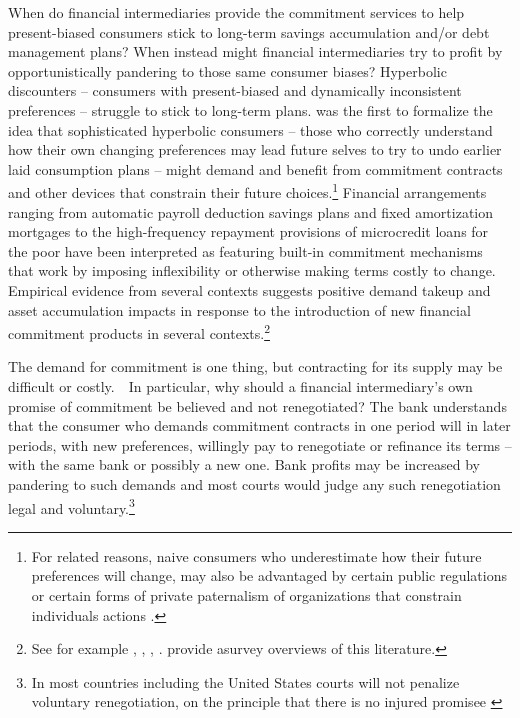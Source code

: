 \documentclass[11pt,english]{article}
\theoremstyle{plain}
\theoremstyle{definition}
\begin{document}
When do financial intermediaries provide the commitment services to help present-biased consumers stick to long-term savings accumulation and/or debt management
plans? When instead might financial intermediaries try to profit by opportunistically pandering to those same consumer biases?
Hyperbolic discounters --{} consumers with present-biased
and dynamically inconsistent preferences -- struggle to stick to long-term plans.  \citet{strotz1956} was the first to formalize the idea that sophisticated hyperbolic consumers -- those who correctly understand how their own  changing preferences may lead future selves to try to  undo earlier laid consumption plans -- might demand and benefit from commitment  contracts and other devices that constrain their future choices.\footnote{For related reasons,  naive consumers who underestimate how their future preferences  will change, may also be advantaged by certain public regulations or certain forms of private paternalism of organizations  that constrain individuals  actions \citep{spiegler2011}.}  Financial arrangements ranging from automatic payroll deduction  savings plans and fixed amortization mortgages to the high-frequency repayment
provisions of microcredit loans for the poor
have been interpreted as featuring built-in commitment mechanisms that work by imposing inflexibility or otherwise making terms costly to change. 
 Empirical evidence from several contexts suggests positive demand takeup and asset accumulation impacts in response to the introduction of new financial commitment
products in several contexts.\footnote{See for example  \citet{ariely_procrastination_2002}, \citet{thaler2004}, \citet{ashraf_tying_2006}, \citet{bauer_behavioral_2012}.  \citet{bryan2010} provide asurvey overviews of this literature.}  



The demand for commitment is one thing, but contracting for its supply may be difficult or costly.\ \ In particular, why should a financial intermediary's own promise of commitment  be believed and not renegotiated? The bank understands that the consumer who demands commitment contracts in one period will in later periods, with new preferences,  willingly  pay to renegotiate or refinance its terms -- with the same bank or possibly a new one. Bank
profits may be increased by pandering to such demands and most courts would judge any such renegotiation legal and voluntary.\footnote{In most countries including the United States courts will not penalize voluntary renegotiation, on the principle that there is no injured promisee \citep[see discussion in][p448]{laibson1997}}     
\end{document}
